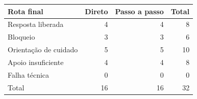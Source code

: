 \begin{tabularx}{\textwidth}{Y r r r}
\toprule Rota final & Direto & Passo a passo & Total \\\midrule
Resposta liberada & 4 & 4 & 8 \\
Bloqueio & 3 & 3 & 6 \\
Orientação de cuidado & 5 & 5 & 10 \\
Apoio insuficiente & 4 & 4 & 8 \\
Falha técnica & 0 & 0 & 0 \\
Total & 16 & 16 & 32 \\
\bottomrule\end{tabularx}
